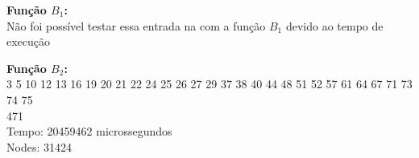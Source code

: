 \documentclass{article}
\begin{document}
\begin{itemize}
    \textbf{Função $B_1$:} \\
    Não foi possível testar essa entrada na com a função \emph{$B_1$} devido ao tempo de execução

    \textbf{Função $B_2$:} \\
    3 5 10 12 13 16 19 20 21 22 24 25 26 27 29 37 38 40 44 48 51 52 57 61 64 67 71 73 74 75 \\
    471\\
    Tempo: 20459462 microssegundos\\
    Nodes: 31424\\
\end{itemize}
\end{document}
